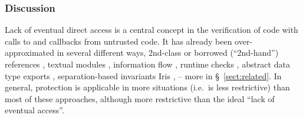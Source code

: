  
 
 \subsubsection*{Discussion} 
Lack of  eventual 
direct access is a central concept in the verification of code with calls to and callbacks  from untrusted code.
It has already been over-approximated in several different ways, \eg
2nd-class \cite{rompf-second-class-oopsla2016,rompf-dont-pop-second-class-ecoop2022}
or borrowed (``2nd-hand'') references
\cite{boyland-promises-icse1998,boyland-aliasburying-spe2001},
 textual modules \cite{OOPSLA22},
information flow \cite{ddd}, runtime
checks \cite{secure-io-fstar-popl2024},
abstract data type exports \cite{vmsl-pldi2023},
  separation-based invariants 
Iris \cite{iris-wasm-pldi2023,cerise-jacm2024},
-- more in  \S~\ref{sect:related}.
In general, protection is applicable in more situations (i.e.\ is less
restrictive) than most of these approaches,
 although more restrictive than the ideal ``lack of eventual access''. 






